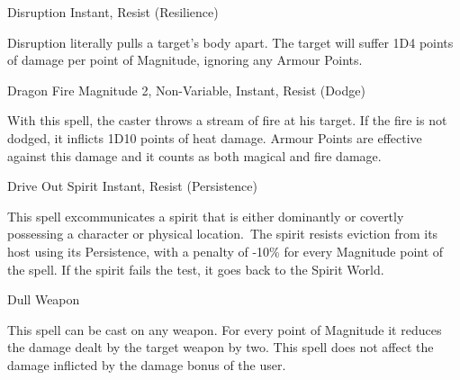 \begin{rpg-spell}
{Disruption}
{Instant, Resist (Resilience)}

Disruption literally pulls a target’s body apart. The target will suffer 1D4 points of damage per point of Magnitude, ignoring any Armour Points. 
\end{rpg-spell}


\begin{rpg-spell}
{Dragon Fire}
{Magnitude 2, Non-Variable, Instant, Resist (Dodge)}

With this spell, the caster throws a stream of fire at his target. If the fire is not dodged, it inflicts 1D10 points of heat damage. Armour Points are effective against this damage and it counts as both magical and fire damage.
\end{rpg-spell}


\begin{rpg-spell}
{Drive Out Spirit}
{Instant, Resist (Persistence)}

This spell excommunicates a spirit that is either dominantly or covertly possessing a character or physical location. The spirit resists eviction from its host using its Persistence, with a penalty of -10\% for every Magnitude point of the spell. If the spirit fails the test, it goes back to the Spirit World.
\end{rpg-spell}


\begin{rpg-spell}
{Dull Weapon}
{}

This spell can be cast on any weapon. For every point of Magnitude it reduces the damage dealt by the target weapon by two. This spell does not affect the damage inflicted by the damage bonus of the user.
\end{rpg-spell}


